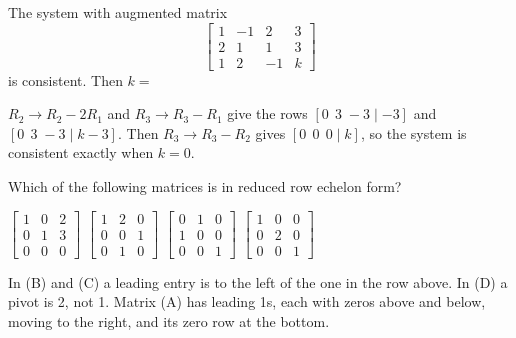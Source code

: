 \begin{question}[id=sys-7, marks=2]
The system with augmented matrix
\[
  \left[\begin{array}{ccc|c} 1 & -1 & 2 & 3 \\ 2 & 1 & 1 & 3 \\ 1 & 2 & -1 & k \end{array}\right]
\]
is consistent. Then $k =$
\begin{solution}
$R_2 \to R_2 - 2R_1$ and $R_3 \to R_3 - R_1$ give the rows $[0\;\, 3\; -3 \mid -3]$ and $[0\;\, 3\; -3 \mid k - 3]$. Then $R_3 \to R_3 - R_2$ gives $[0\;\, 0\;\, 0 \mid k]$, so the system is consistent exactly when $k = 0$.
\end{solution}
\end{question}

\begin{question}[id=sys-8]
Which of the following matrices is in reduced row echelon form?
\begin{options}
  \correct $\begin{bmatrix} 1 & 0 & 2 \\ 0 & 1 & 3 \\ 0 & 0 & 0 \end{bmatrix}$
  \option $\begin{bmatrix} 1 & 2 & 0 \\ 0 & 0 & 1 \\ 0 & 1 & 0 \end{bmatrix}$
  \option $\begin{bmatrix} 0 & 1 & 0 \\ 1 & 0 & 0 \\ 0 & 0 & 1 \end{bmatrix}$
  \option $\begin{bmatrix} 1 & 0 & 0 \\ 0 & 2 & 0 \\ 0 & 0 & 1 \end{bmatrix}$
\end{options}
\begin{solution}
In (B) and (C) a leading entry is to the left of the one in the row above. In (D) a pivot is 2, not 1. Matrix (A) has leading 1s, each with zeros above and below, moving to the right, and its zero row at the bottom.
\end{solution}
\end{question}

